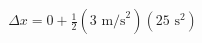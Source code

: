 \documentclass[preview]{standalone}
\begin{document}
\begin{align*}
\Delta x = 0 + \frac{1}{2}(3 \text{ m/s}^2)(25 \text{ s}^2)
\end{align*}
\end{document}

